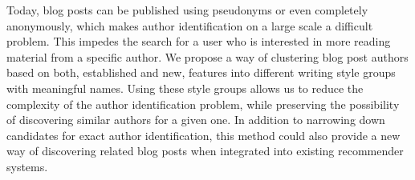 
Today, blog posts can be published using pseudonyms or even completely anonymously, which makes author identification on a large scale a difficult problem. %
This impedes the search for a user who is interested in more reading material from a specific author. %
We propose a way of clustering blog post authors based on both, established and new, features into different writing style groups with meaningful names.
Using these style groups allows us to reduce the complexity of the author identification problem, while preserving the possibility of discovering similar authors for a given one. %
In addition to narrowing down candidates for exact author identification, this method could also provide a new way of discovering related blog posts when integrated into existing recommender systems. %


